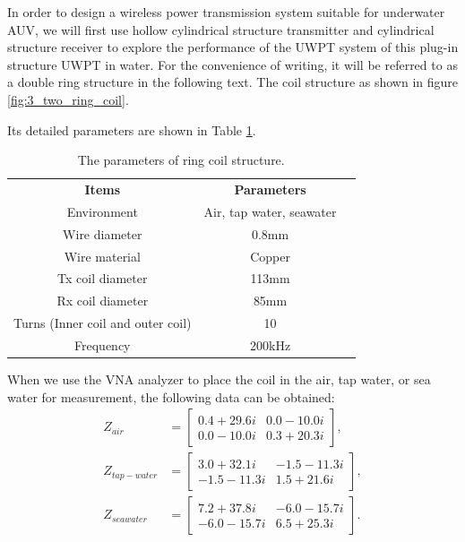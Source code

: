 In order to design a wireless power transmission system suitable for underwater AUV, we will first use hollow cylindrical structure transmitter and cylindrical structure receiver to explore the performance of the UWPT system of this plug-in structure UWPT in water. For the convenience of writing, it will be referred to as a double ring structure in the following text. The coil structure as shown in figure \ref{fig:3_two_ring_coil}.

Its detailed parameters are shown in Table \ref{table:ring coil parameters}.

\begin{table}[!t]
    \centering
    \caption{The parameters of ring coil structure.}
    \begin{tabular}{ c|cc }
        \thickhline
        \textbf{Items}                    & \textbf{Parameters}      \\
        \thickhline
        Environment                       & Air, tap water, seawater \\ \hline
        Wire diameter                     & 0.8mm                    \\ \hline
        Wire material                     & Copper                   \\
        \hline
        Tx coil diameter                  & 113mm                    \\ \hline
        Rx coil diameter                  & 85mm                     \\ \hline
        Turns (Inner coil and outer coil) & 10                       \\ \hline
        Frequency                         & 200kHz                   \\ \hline
    \end{tabular}
    \label{table:ring coil parameters}
\end{table}

When we use the VNA analyzer to place the coil in the air, tap water, or sea water for measurement, the following data can be obtained:
\begin{equation*}
    \begin{aligned}
        Z_{air}       & =
        \begin{bmatrix}
            0.4 +29.6i & 0.0 -10.0i \\
            0.0 -10.0i & 0.3 +20.3i
        \end{bmatrix}, \\
        Z_{tap-water} & =
        \begin{bmatrix}
            3.0 +32.1i  & -1.5 -11.3i \\
            -1.5 -11.3i & 1.5 +21.6i
        \end{bmatrix}, \\
        Z_{seawater}  & =
        \begin{bmatrix}
            7.2 +37.8i  & -6.0 -15.7i \\
            -6.0 -15.7i & 6.5 +25.3i
        \end{bmatrix}.
    \end{aligned}
\end{equation*}

